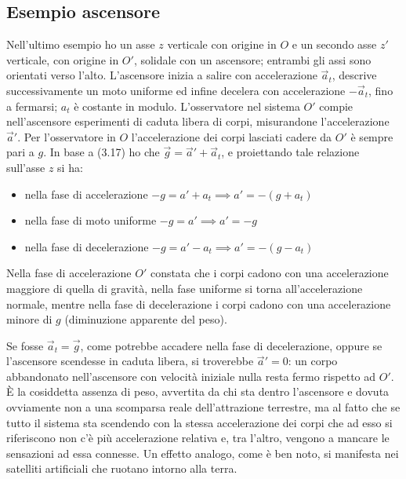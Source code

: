 \documentclass[class=book, crop=false, oneside, 12pt]{standalone}
\begin{document}
\subsection{Esempio ascensore}

Nell'ultimo esempio ho un asse \(z\) verticale con origine in \(O\) e un secondo asse \(z'\) verticale, con origine in \(O'\), solidale con un ascensore; 
entrambi gli assi sono orientati verso l'alto. 
L'ascensore inizia a salire con accelerazione \(\overrightarrow{a}_t\), descrive successivamente un moto uniforme ed infine decelera con accelerazione \(-\overrightarrow{a}_t\), fino a fermarsi; \(a_t\) è costante in modulo.
L'osservatore nel sistema \(O'\) compie nell'ascensore esperimenti di caduta libera di corpi, misurandone l'accelerazione \(\overrightarrow{a}'\).
Per l'osservatore in \(O\) l'accelerazione dei corpi lasciati cadere da \(O'\) è sempre pari a \(g\). 
In base a (3.17) ho che \(\overrightarrow{g} =\overrightarrow{a}'+ \overrightarrow{a}_t\), e proiettando tale relazione sull'asse \(z\) si ha:
\begin{itemize}
    \item nella fase di accelerazione \(-g = a' + a_t \implies a' = -(g + a_t)\)
    \item nella fase di moto uniforme \(-g = a' \implies a' = -g\)
    \item nella fase di decelerazione \(-g = a' - a_t \implies a' = -(g-a_t)\) 
\end{itemize}
Nella fase di accelerazione \(O'\) constata che i corpi cadono con una accelerazione maggiore di quella di gravità,
nella fase uniforme si torna all'accelerazione normale, mentre nella fase di decelerazione i corpi cadono con una accelerazione minore di \(g\) (diminuzione apparente del peso).

Se fosse \(\overrightarrow{a}_t = \overrightarrow{g}\), come potrebbe accadere nella fase di decelerazione, oppure se l'ascensore scendesse in caduta libera, si troverebbe \(\overrightarrow{a}'= 0\): 
un corpo abbandonato nell'ascensore con velocità iniziale nulla resta fermo rispetto ad \(O'\). \\
È la cosiddetta assenza di peso, avvertita da chi sta dentro l'ascensore e dovuta ovviamente non a una scomparsa reale dell'attrazione terrestre, ma al fatto che se tutto il sistema sta scendendo con la stessa accelerazione dei corpi che ad esso si riferiscono non c'è più accelerazione relativa e, tra l'altro, vengono a mancare le sensazioni ad essa connesse. 
Un effetto analogo, come è ben noto, si manifesta nei satelliti artificiali che ruotano intorno alla terra.
\end{document}
